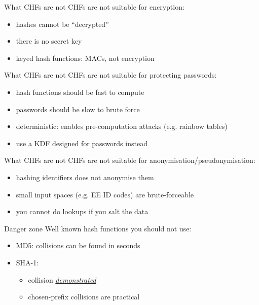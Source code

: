 \begin{frame}{What CHFs are not}
  CHFs are not suitable for encryption:
  \begin{itemize}[<+(1)->]
    \item hashes cannot be \enquote{decrypted}
    \item there is no secret key
    \item keyed hash functions: MACs, not encryption
  \end{itemize}
\end{frame}

\begin{frame}{What CHFs are not}
  CHFs are not suitable for protecting passwords:
  \begin{itemize}[<+(1)->]
    \item hash functions should be fast to compute
    \item passwords should be slow to brute force
    \item deterministic: enables pre-computation attacks (e.g. rainbow tables)
    \item use a KDF designed for passwords instead
  \end{itemize}
\end{frame}

\begin{frame}{What CHFs are not}
  CHFs are not suitable for anonymisation/pseudonymisation:
  \begin{itemize}[<+(1)->]
    \item hashing identifiers does not anonymise them
    \item small input spaces (e.g. EE ID codes) are brute-forceable
    \item you cannot do lookups if you salt the data
  \end{itemize}
\end{frame}

\begin{frame}{Danger zone}
  Well known hash functions you should not use:
  \begin{itemize}[<+(1)->]
    \item MD5: collisions can be found in seconds
    \item SHA-1:
    \begin{itemize}
      \item collision \href{https://shattered.io}{\textit{demonstrated}}
      \item chosen-prefix collisions are practical
    \end{itemize} 
  \end{itemize}
\end{frame}

